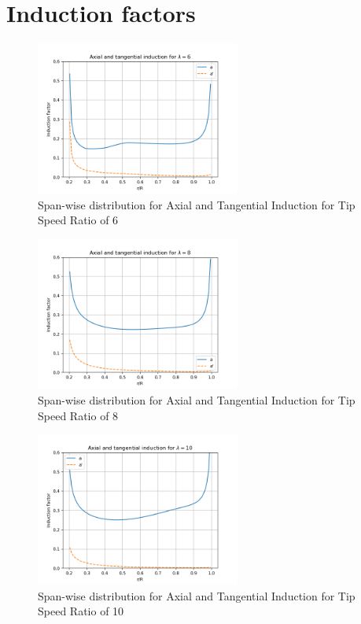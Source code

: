 \section{Induction factors}
\begin{figure}[H]
    \centering
    \includegraphics[width=0.6\textwidth]{Figures/a_a_prime_6.png}
    \caption{Span-wise distribution for Axial and Tangential Induction for Tip Speed Ratio of 6}
    \label{fig:span-wise distribution for axial and tangential induction - lambda 6}
\end{figure}
\begin{figure}[H]
    \centering
    \includegraphics[width=0.6\textwidth]{Figures/a_a_p_8.png}
    \caption{Span-wise distribution for Axial and Tangential Induction for Tip Speed Ratio of 8}
    \label{fig:span-wise distribution for axial and tangential induction - lambda 8}
\end{figure}
\begin{figure}[H]
    \centering
    \includegraphics[width=0.6\textwidth]{Figures/a_a_p_10.png}
    \caption{Span-wise distribution for Axial and Tangential Induction for Tip Speed Ratio of 10}
    \label{fig:span-wise distribution for axial and tangential induction - lambda 10}
\end{figure}


